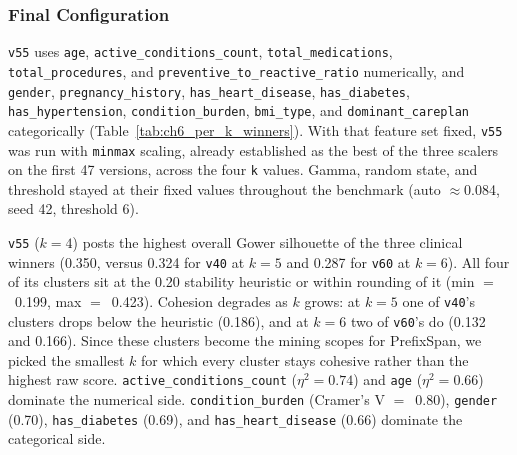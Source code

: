 \subsubsection*{Final Configuration}

\texttt{v55} uses \texttt{age}, \texttt{active\_conditions\_count}, \texttt{total\_medications}, \texttt{total\_procedures}, and \texttt{preventive\_to\_reactive\_ratio} numerically, and \texttt{gender}, \texttt{pregnancy\_history}, \texttt{has\_heart\_disease}, \texttt{has\_diabetes}, \texttt{has\_hypertension}, \texttt{condition\_burden}, \texttt{bmi\_type}, and \texttt{dominant\_careplan} categorically (Table~\ref{tab:ch6_per_k_winners}). With that feature set fixed, \texttt{v55} was run with \texttt{minmax} scaling, already established as the best of the three scalers on the first 47 versions, across the four \texttt{k} values. Gamma, random state, and threshold stayed at their fixed values throughout the benchmark (auto $\approx$0.084, seed 42, threshold 6).

\texttt{v55} ($k{=}4$) posts the highest overall Gower silhouette of the three clinical winners (0.350, versus 0.324 for \texttt{v40} at $k{=}5$ and 0.287 for \texttt{v60} at $k{=}6$). All four of its clusters sit at the 0.20 stability heuristic or within rounding of it (min $=$~0.199, max $=$~0.423).
 Cohesion degrades as $k$ grows: at $k{=}5$ one of \texttt{v40}'s clusters drops below the heuristic (0.186), and at $k{=}6$ two of \texttt{v60}'s do (0.132 and 0.166). Since these clusters become the mining scopes for PrefixSpan, we picked the smallest $k$ for which every cluster stays cohesive rather than the highest raw score. \texttt{active\_conditions\_count} ($\eta^2{=}0.74$) and \texttt{age} ($\eta^2{=}0.66$) dominate the numerical side. \texttt{condition\_burden} (Cramer's V $=$~0.80), \texttt{gender} (0.70), \texttt{has\_diabetes} (0.69), and \texttt{has\_heart\_disease} (0.66) dominate the categorical side.


